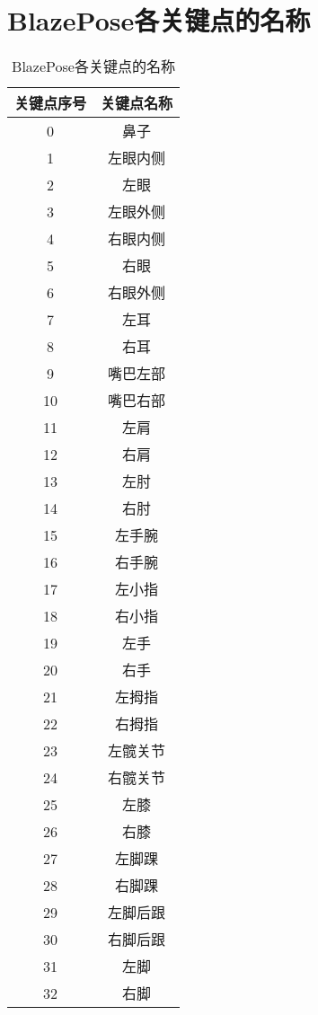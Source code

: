 \chapter{BlazePose各关键点的名称}
\label{keypoints}
\begin{table}[htbp]
\caption{BlazePose各关键点的名称}
\label{keypointstable}
\vspace{0.5em}\centering\wuhao
\begin{tabular}{cc}
\toprule[1.5pt]
关键点序号 & 关键点名称  \\
\midrule[1pt]
0 & 鼻子  \\
1 & 左眼内侧  \\
2 & 左眼  \\
3 & 左眼外侧  \\
4 & 右眼内侧  \\
5 & 右眼  \\
6 & 右眼外侧  \\
7 & 左耳  \\
8 & 右耳  \\
9 & 嘴巴左部  \\
10 & 嘴巴右部  \\
11 & 左肩  \\
12 & 右肩  \\
13 & 左肘  \\
14 & 右肘  \\
15 & 左手腕  \\
16 & 右手腕  \\
17 & 左小指 \\
18 & 右小指  \\
19 & 左手  \\
20 & 右手  \\
21 & 左拇指  \\
22 & 右拇指  \\
23 & 左髋关节  \\
24 & 右髋关节  \\
25 & 左膝  \\
26 & 右膝  \\
27 & 左脚踝  \\
28 & 右脚踝  \\
29 & 左脚后跟  \\
30 & 右脚后跟  \\
31 & 左脚  \\
32 & 右脚 \\
\bottomrule[1.5pt]
\end{tabular}
\end{table}
